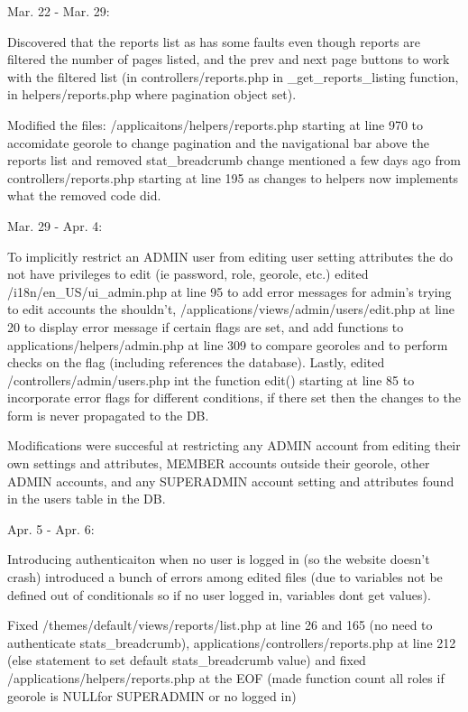 \documentclass{article}
\begin{document}
Mar. 22 - Mar. 29:

    Discovered that the reports list as has some faults even though reports are filtered the number of pages listed, and the prev and next page buttons to work with the filtered list (in controllers/reports.php in _get_reports_listing function, in helpers/reports.php where pagination object set).
                     
    Modified the files: /applicaitons/helpers/reports.php starting at line 970 to accomidate georole to change pagination and the navigational bar above the reports list and removed stat_breadcrumb change mentioned a few days ago from controllers/reports.php starting at line 195 as changes to helpers now implements what the removed code did.
                       
Mar. 29 - Apr. 4:

    To implicitly restrict an ADMIN user from editing user setting attributes the do not have privileges to edit (ie password, role, georole, etc.) edited /i18n/en_US/ui_admin.php at line 95 to add error messages for admin's trying to edit accounts the shouldn't, /applications/views/admin/users/edit.php at line 20 to display error message if certain flags are set, and add functions to applications/helpers/admin.php at line 309 to compare georoles and to perform checks on the flag (including references the database).  Lastly, edited /controllers/admin/users.php int the function edit() starting at line 85 to incorporate error flags for different conditions, if there set then the changes to the form is never propagated to the DB.
        
    Modifications were succesful at restricting any ADMIN account from editing their own settings and attributes, MEMBER accounts outside their georole, other ADMIN accounts, and any SUPERADMIN account setting and attributes found in the users table in the DB.
                                                                               
Apr. 5 - Apr. 6:

    Introducing authenticaiton when no user is logged in (so the website doesn't crash) introduced a bunch of errors among edited files (due to variables not be defined out of conditionals so if no user logged in, variables dont get values).
            
    Fixed /themes/default/views/reports/list.php at line 26 and 165 (no need to authenticate stats_breadcrumb), applications/controllers/reports.php at line 212 (else statement to set default stats_breadcrumb value) and fixed /applications/helpers/reports.php at the EOF (made function count all roles if georole is NULLfor SUPERADMIN or no logged in)
                
\end{document}
